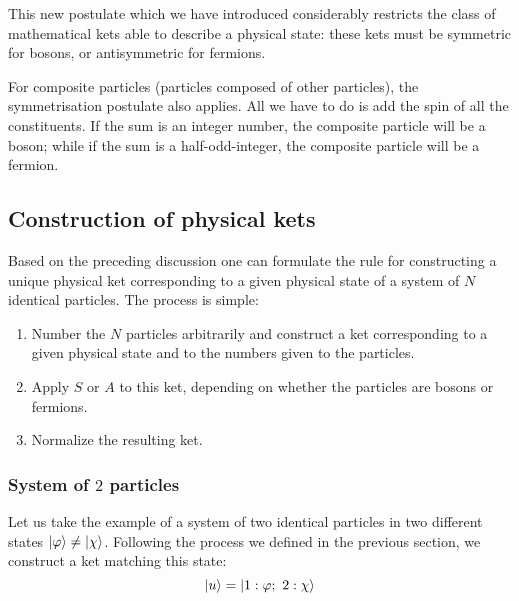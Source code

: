 This new postulate which we have introduced considerably restricts the class of mathematical kets able to describe a physical state: these kets must be symmetric for bosons, or antisymmetric for fermions.

For composite particles (particles composed of other particles), the symmetrisation postulate also applies. All we have to do is add the spin of all the constituents. If the sum is an integer number, the composite particle will be a boson; while if the sum is a half-odd-integer, the composite particle will be a fermion.

\subsection{Construction of physical kets}

Based on the preceding discussion one can formulate the rule for constructing a unique physical ket corresponding to a given physical state of a system of $N$ identical particles. The process is simple:
\begin{enumerate}
    \item Number the $N$ particles arbitrarily and construct a ket corresponding to a given physical state and to the numbers given to the particles.
    \item Apply $S$ or $A$ to this ket, depending on whether the particles are bosons or fermions.
    \item Normalize the resulting ket.
\end{enumerate}

\subsubsection{System of $2$ particles}

Let us take the example of a system of two identical particles in two different states $\ket{\varphi}\neq \ket{\chi}$. Following the process we defined in the previous section, we construct a ket matching this state:
\begin{equation}
    \ket{u} = \ket{1:\varphi;\ 2:\chi}
\end{equation} 

